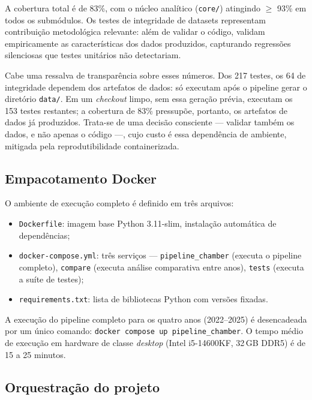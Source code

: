 \documentclass[
      12pt,
      a4paper,
      openright,
      oneside,
      chapter=TITLE,
      section=TITLE,
      english,
      french,
      spanish,
      brazilian
    ]{abntex2}
\begin{document}
    A cobertura total é de 83\%, com o núcleo analítico (\texttt{core/}) atingindo
    $\geq$ 93\% em todos os submódulos. Os testes de integridade de datasets
    representam contribuição metodológica relevante: além de validar o código,
    validam empiricamente as características dos dados produzidos, capturando
    regressões silenciosas que testes unitários não detectariam.

    Cabe uma ressalva de transparência sobre esses números. Dos 217 testes, os 64 de
    integridade dependem dos artefatos de dados: só executam após o pipeline gerar o
    diretório \texttt{data/}. Em um \textit{checkout} limpo, sem essa geração prévia,
    executam os 153 testes restantes; a cobertura de 83\% pressupõe, portanto, os
    artefatos de dados já produzidos. Trata-se de uma decisão consciente --- validar
    também os dados, e não apenas o código ---, cujo custo é essa dependência de
    ambiente, mitigada pela reprodutibilidade containerizada.
    
    \subsection{Empacotamento Docker}
    
    O ambiente de execução completo é definido em três arquivos:
    
    \begin{itemize}
        \item \texttt{Dockerfile}: imagem base Python 3.11-slim, instalação automática de dependências;
        \item \texttt{docker-compose.yml}: três serviços --- \texttt{pipeline\_chamber} (executa o pipeline completo), \texttt{compare} (executa análise comparativa entre anos), \texttt{tests} (executa a suíte de testes);
        \item \texttt{requirements.txt}: lista de bibliotecas Python com versões fixadas.
    \end{itemize}
    
    A execução do pipeline completo para os quatro anos (2022--2025) é desencadeada por um único comando: \texttt{docker compose up pipeline\_chamber}. O tempo médio de execução em hardware de classe \textit{desktop} (Intel i5-14600KF, 32\,GB DDR5) é de 15 a 25 minutos.
    
    
    
    \subsection{Orquestração do projeto}
    
\end{document}
